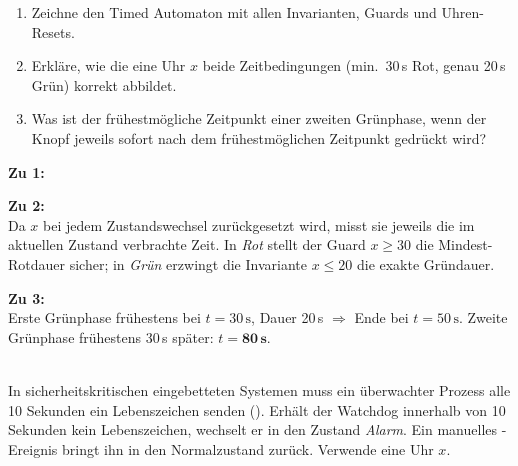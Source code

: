 \begin{enumerate}
    \item Zeichne den Timed Automaton mit allen Invarianten, Guards und Uhren-Resets.
    \item Erkläre, wie die eine Uhr $x$ beide Zeitbedingungen (min.\ 30\,s Rot, genau 20\,s
          Grün) korrekt abbildet.
    \item Was ist der frühestmögliche Zeitpunkt einer zweiten Grünphase, wenn der Knopf
          jeweils sofort nach dem frühestmöglichen Zeitpunkt gedrückt wird?
\end{enumerate}

\begin{loesung}
\textbf{Zu 1:}

\begin{center}
\end{center}

\textbf{Zu 2:}\\
Da $x$ bei jedem Zustandswechsel zurückgesetzt wird, misst sie jeweils die im aktuellen
Zustand verbrachte Zeit. In \textit{Rot} stellt der Guard $x \geq 30$ die Mindest-Rotdauer
sicher; in \textit{Grün} erzwingt die Invariante $x \leq 20$ die exakte Gründauer.

\textbf{Zu 3:}\\
Erste Grünphase frühestens bei $t = 30\,\text{s}$, Dauer 20\,s $\Rightarrow$ Ende bei
$t = 50\,\text{s}$.
Zweite Grünphase frühestens 30\,s später: $t = \mathbf{80\,\text{s}}$.
\end{loesung}

\umbruchlsg


\\
In sicherheitskritischen eingebetteten Systemen muss ein überwachter Prozess alle 10 Sekunden
ein Lebenszeichen senden (). Erhält der Watchdog innerhalb von 10 Sekunden
kein Lebenszeichen, wechselt er in den Zustand \textit{Alarm}. Ein manuelles
-Ereignis bringt ihn in den Normalzustand zurück. Verwende eine Uhr $x$.

